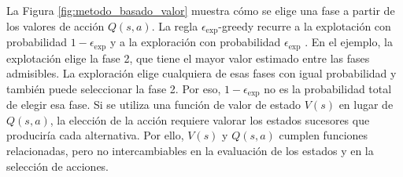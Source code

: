 La Figura \ref{fig:metodo_basado_valor} muestra cómo se elige una fase a partir de los valores de acción $Q(s,a)$. La regla $\epsilon_{\mathrm{exp}}$-greedy recurre a la explotación con probabilidad $1-\epsilon_{\mathrm{exp}}$ y a la exploración con probabilidad $\epsilon_{\mathrm{exp}}$ \cite{suttonRL}. En el ejemplo, la explotación elige la fase 2, que tiene el mayor valor estimado entre las fases admisibles. La exploración elige cualquiera de esas fases con igual probabilidad y también puede seleccionar la fase 2. Por eso, $1-\epsilon_{\mathrm{exp}}$ no es la probabilidad total de elegir esa fase. Si se utiliza una función de valor de estado $V(s)$ en lugar de $Q(s,a)$, la elección de la acción requiere valorar los estados sucesores que produciría cada alternativa. Por ello, $V(s)$ y $Q(s,a)$ cumplen funciones relacionadas, pero no intercambiables en la evaluación de los estados y en la selección de acciones.

